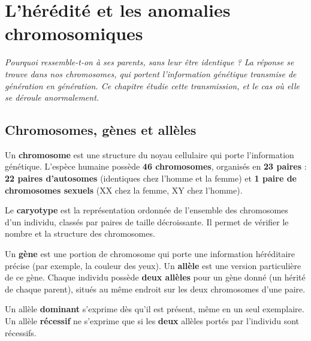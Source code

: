 \chapter{L'hérédité et les anomalies chromosomiques}

\noindent\textit{Pourquoi ressemble-t-on à ses parents, sans leur être identique ? La
réponse se trouve dans nos chromosomes, qui portent l'information génétique transmise de
génération en génération. Ce chapitre étudie cette transmission, et le cas où elle se
déroule anormalement.}
\vspace{8pt}

\connecteBanner

\section{Chromosomes, gènes et allèles}

\begin{definition}[Chromosome]
Un \textbf{chromosome} est une structure du noyau cellulaire qui porte l'information
génétique. L'espèce humaine possède \textbf{46 chromosomes}, organisés en \textbf{23
paires} : \textbf{22 paires d'autosomes} (identiques chez l'homme et la femme) et
\textbf{1 paire de chromosomes sexuels} (XX chez la femme, XY chez l'homme).
\end{definition}

\begin{propriete}[Le caryotype]
Le \textbf{caryotype} est la représentation ordonnée de l'ensemble des chromosomes d'un
individu, classés par paires de taille décroissante. Il permet de vérifier le nombre et
la structure des chromosomes.
\end{propriete}

\begin{definition}
Un \textbf{gène} est une portion de chromosome qui porte une information héréditaire
précise (par exemple, la couleur des yeux). Un \textbf{allèle} est une version
particulière de ce gène. Chaque individu possède \textbf{deux allèles} pour un gène donné
(un hérité de chaque parent), situés au même endroit sur les deux chromosomes d'une
paire.
\end{definition}

\begin{propriete}
Un allèle \textbf{dominant} s'exprime dès qu'il est présent, même en un seul exemplaire.
Un allèle \textbf{récessif} ne s'exprime que si les \textbf{deux} allèles portés par
l'individu sont récessifs.
\end{propriete}

